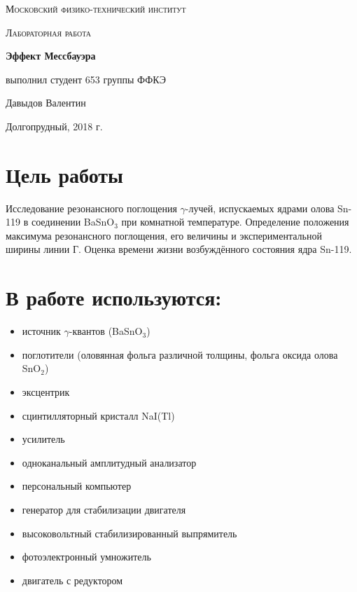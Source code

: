 \documentclass[a4paper]{article}
\begin{document}
\begin{titlepage}
	\centering
	\vspace{5cm}
	{\scshape\LARGE Московский физико-технический институт \par}
	\vspace{4cm}
	{\scshape\Large Лабораторная работа \par}
	\vspace{1cm}
	{\huge\bfseries Эффект Мессбауэра \par}
	\vspace{1cm}
	\vfill
\begin{flushright}
	{\large выполнил студент 653 группы ФФКЭ}\par
	\vspace{0.3cm}
	{\LARGE Давыдов Валентин} \par

\end{flushright}
	

	\vfill

	Долгопрудный, 2018 г.
\end{titlepage}

\section{Цель работы}
Исследование резонансного поглощения $\gamma$-лучей, испускаемых ядрами олова Sn-119 в соединении BaSnO$_3$ при комнатной температуре. Определение положения максимума резонансного поглощения, его величины и экспериментальной ширины линии Г. Оценка времени жизни возбуждённого состояния ядра Sn-119.

\section{В работе используются:}
\begin{itemize}
    \item источник $\gamma$-квантов (BaSnO$_3$)
    \item поглотители (оловянная фольга различной толщины, фольга оксида олова SnO$_2$)
    \item эксцентрик
    \item сцинтилляторный кристалл NaI(Tl)
    \item усилитель
    \item одноканальный амплитудный анализатор
    \item персональный компьютер
    \item генератор для стабилизации двигателя
    \item высоковольтный стабилизированный выпрямитель
    \item фотоэлектронный умножитель
    \item двигатель с редуктором
\end{itemize}
\end{document}
